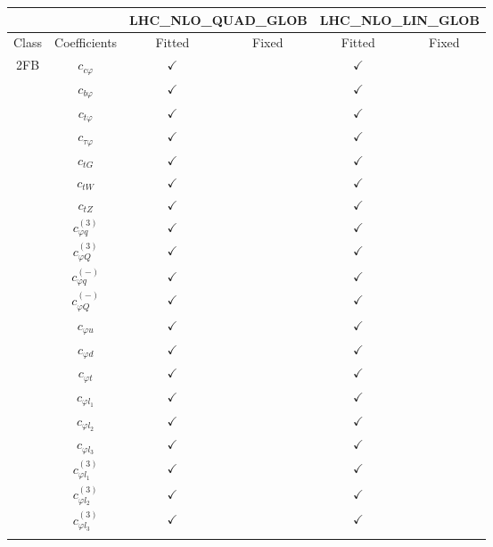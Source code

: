 \documentclass{article}
\begin{document}
\begin{table}[H]
\centering
\begin{tabular}{|c|c|c|c|c|c|}
\hline
 &  & \multicolumn{2}{c|}{LHC_NLO_QUAD_GLOB} & \multicolumn{2}{c|}{LHC_NLO_LIN_GLOB} \\ \hline
Class & Coefficients & Fitted & Fixed  & Fitted & Fixed  \\ \hline
\multirow{23}{*}{2FB}
 & $c_{c \varphi}$ & $\checkmark$ &  & $\checkmark$ & \\ \cline{2-6}
 & $c_{b \varphi}$ & $\checkmark$ &  & $\checkmark$ & \\ \cline{2-6}
 & $c_{t \varphi}$ & $\checkmark$ &  & $\checkmark$ & \\ \cline{2-6}
 & $c_{\tau \varphi}$ & $\checkmark$ &  & $\checkmark$ & \\ \cline{2-6}
 & $c_{tG}$ & $\checkmark$ &  & $\checkmark$ & \\ \cline{2-6}
 & $c_{tW}$ & $\checkmark$ &  & $\checkmark$ & \\ \cline{2-6}
 & $c_{tZ}$ & $\checkmark$ &  & $\checkmark$ & \\ \cline{2-6}
 & $c_{\varphi q}^{(3)}$ & $\checkmark$ &  & $\checkmark$ & \\ \cline{2-6}
 & $c_{\varphi Q}^{(3)}$ & $\checkmark$ &  & $\checkmark$ & \\ \cline{2-6}
 & $c_{\varphi q}^{(-)}$ & $\checkmark$ &  & $\checkmark$ & \\ \cline{2-6}
 & $c_{\varphi Q}^{(-)}$ & $\checkmark$ &  & $\checkmark$ & \\ \cline{2-6}
 & $c_{\varphi u}$ & $\checkmark$ &  & $\checkmark$ & \\ \cline{2-6}
 & $c_{\varphi d}$ & $\checkmark$ &  & $\checkmark$ & \\ \cline{2-6}
 & $c_{\varphi t}$ & $\checkmark$ &  & $\checkmark$ & \\ \cline{2-6}
 & $c_{\varphi l_1}$ & $\checkmark$ &  & $\checkmark$ & \\ \cline{2-6}
 & $c_{\varphi l_2}$ & $\checkmark$ &  & $\checkmark$ & \\ \cline{2-6}
 & $c_{\varphi l_3}$ & $\checkmark$ &  & $\checkmark$ & \\ \cline{2-6}
 & $c_{\varphi l_1}^{(3)}$ & $\checkmark$ &  & $\checkmark$ & \\ \cline{2-6}
 & $c_{\varphi l_2}^{(3)}$ & $\checkmark$ &  & $\checkmark$ & \\ \cline{2-6}
 & $c_{\varphi l_3}^{(3)}$ & $\checkmark$ &  & $\checkmark$ & \\ \cline{2-6}

\end{tabular}
\end{table}
\end{document}
